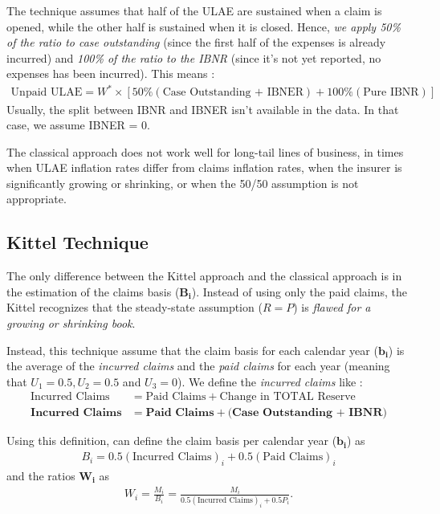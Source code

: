 \documentclass[11pt, english]{memoir}
\numberwithin{definition}{section}
\begin{document}
	The technique assumes that half of the ULAE are sustained when a claim is opened, while the other half is sustained when it is closed. Hence, \emph{we apply 50\% of the ratio to case outstanding} (since the first half of the expenses is already incurred) and \emph{100\% of the ratio to the IBNR} (since it's not yet reported, no expenses has been incurred). This means :
	\begin{align*}
	\text{Unpaid ULAE} = W^{*}\times\left[50\%(\text{Case Outstanding + IBNER}) + 100\%(\text{Pure IBNR}) \right]
	\end{align*}
	Usually, the split between IBNR and IBNER isn't available in the data. In that case, we assume IBNER = 0. 
	
	The classical approach does not work well for long-tail lines of business, in times when ULAE inflation rates differ	from claims inflation rates, when the insurer is significantly growing or shrinking, or when the 50/50 assumption is not appropriate.\\
	
	
	
	
	
	
\subsection{Kittel Technique}
	
	The only difference between the Kittel approach and the classical approach is in the estimation of the claims basis ($ \mathbf{B_{i}} $). Instead of using only the paid claims, the Kittel recognizes that the steady-state assumption ($ R = P $) is \emph{flawed for a growing or shrinking book}.
	
	Instead, this technique assume that the claim basis for each calendar year ($ \mathbf{b_{i}} $) is the average of the \emph{incurred claims} and the \emph{paid claims} for each year (meaning that $ U_{1} = 0.5, U_{2} = 0.5 $ and $ U_{3} = 0 $). We define the \emph{incurred claims} like :
	\begin{align*}
	\text{Incurred Claims} &= \text{Paid Claims} + \text{Change in TOTAL Reserve}\\
	\textbf{Incurred Claims} &= \textbf{Paid Claims} + \textbf{(Case Outstanding + IBNR)}
	\end{align*}
	
	Using this definition, can define the claim basis per calendar year ($ \mathbf{b_{i}} $) as 
	\begin{align*}
	B_{i} = 0.5(\text{Incurred Claims})_{i} + 0.5(\text{Paid Claims})_{i}
	\end{align*}
	and the ratios $ \mathbf{W_{i}} $ as 
	\begin{align*}
	W_{i} = \frac{M_{i}}{B_{i}} = \frac{M_{i}}{0.5(\text{Incurred Claims})_{i} + 0.5P_{i}}.
	\end{align*} 
	
\end{document}
